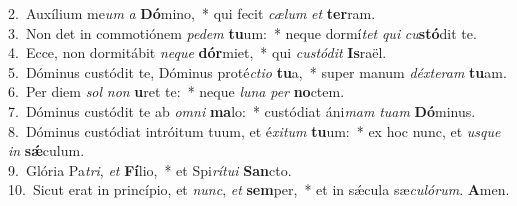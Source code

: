 {2.~}Auxílium me\textit{um} \textit{a} \textbf{Dó}mino,~* qui fecit \textit{cæ}\textit{lum} \textit{et} \textbf{ter}ram.\\
{3.~}Non det in commotiónem \textit{pe}\textit{dem} \textbf{tu}um:~* neque dormí\textit{tet} \textit{qui} \textit{cu}\textbf{stó}dit te.\\
{4.~}Ecce, non dormitábit \textit{ne}\textit{que} \textbf{dór}miet,~* qui \textit{cu}\textit{stó}\textit{dit} \textbf{Is}raël.\\
{5.~}Dóminus custódit te, Dóminus proté\textit{cti}\textit{o} \textbf{tu}a,~* super manum \textit{déx}\textit{te}\textit{ram} \textbf{tu}am.\\
{6.~}Per diem \textit{sol} \textit{non} \textbf{u}ret te:~* neque \textit{lu}\textit{na} \textit{per} \textbf{no}ctem.\\
{7.~}Dóminus custódit te ab \textit{om}\textit{ni} \textbf{ma}lo:~* custódiat áni\textit{mam} \textit{tu}\textit{am} \textbf{Dó}minus.\\
{8.~}Dóminus custódiat intróitum tuum, et é\textit{xi}\textit{tum} \textbf{tu}um:~* ex hoc nunc, et \textit{us}\textit{que} \textit{in} \textbf{sǽ}culum.\\
{9.~}Glória Pa\textit{tri}, \textit{et} \textbf{Fí}lio,~* et Spi\textit{rí}\textit{tu}\textit{i} \textbf{San}cto.\\
{10.~}Sicut erat in princípio, et \textit{nunc}, \textit{et} \textbf{sem}per,~* et in sǽcula sæ\textit{cu}\textit{ló}\textit{rum}. \textbf{A}men.\\
